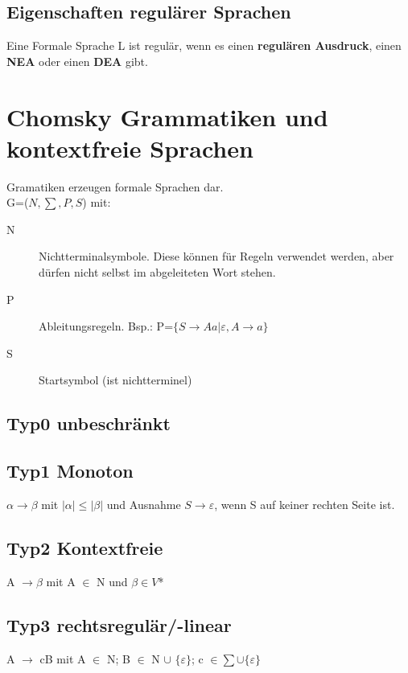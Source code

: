 \documentclass[12pt,a4paper]{article}
\begin{document}
\subsection{Eigenschaften regulärer Sprachen}

Eine Formale Sprache L ist regulär, wenn es einen \textbf{regulären Ausdruck}, einen \textbf{NEA} oder einen \textbf{DEA} gibt.

\section{Chomsky Grammatiken und kontextfreie Sprachen}
	Gramatiken erzeugen formale Sprachen dar.\\
	G=($N, \sum , P, S$) mit:\\
	\begin{description}
		\item[N] Nichtterminalsymbole. Diese können für Regeln verwendet werden, aber dürfen nicht selbst im abgeleiteten Wort stehen.
		\item[P] Ableitungsregeln. Bsp.: P=$\{ S \rightarrow Aa | \varepsilon , A \rightarrow a \} $ 
		\item[S] Startsymbol (ist nichtterminel)
	\end{description}

	\subsection{Typ0 unbeschränkt}
    \subsection{Typ1 Monoton}
    $\alpha \rightarrow \beta$ mit $| \alpha | \leq  | \beta |$ und Ausnahme $S \rightarrow \varepsilon$, wenn S auf keiner rechten Seite ist.
    \subsection{Typ2 Kontextfreie}
	A $\rightarrow \beta$ mit A $\in$ N und $\beta \in V$* 
    \subsection{Typ3 rechtsregulär/-linear}
	A $\rightarrow$ cB mit A $\in$ N; B $\in$ N $\cup$ $\{ \varepsilon \}$; c $\in \sum \cup \{ \varepsilon \}$
\end{document}
